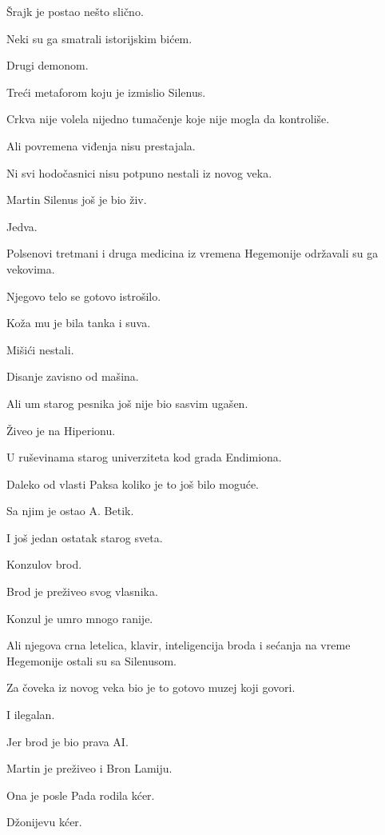 \bigskip

Šrajk je postao nešto slično.

Neki su ga smatrali istorijskim bićem.

Drugi demonom.

Treći metaforom koju je izmislio Silenus.

Crkva nije volela nijedno tumačenje koje nije mogla da kontroliše.

Ali povremena viđenja nisu prestajala.

\bigskip

Ni svi hodočasnici nisu potpuno nestali iz novog veka.

Martin Silenus još je bio živ.

Jedva.

\bigskip

Polsenovi tretmani i druga medicina iz vremena Hegemonije održavali su ga vekovima.

Njegovo telo se gotovo istrošilo.

Koža mu je bila tanka i suva.

Mišići nestali.

Disanje zavisno od mašina.

Ali um starog pesnika još nije bio sasvim ugašen.

\bigskip

Živeo je na Hiperionu.

U ruševinama starog univerziteta kod grada Endimiona.

Daleko od vlasti Paksa koliko je to još bilo moguće.

Sa njim je ostao A. Betik.

I još jedan ostatak starog sveta.

Konzulov brod.

\bigskip

Brod je preživeo svog vlasnika.

Konzul je umro mnogo ranije.

Ali njegova crna letelica, klavir, inteligencija broda i sećanja na vreme Hegemonije ostali su sa Silenusom.

Za čoveka iz novog veka bio je to gotovo muzej koji govori.

I ilegalan.

Jer brod je bio prava AI.

\bigskip

Martin je preživeo i Bron Lamiju.

Ona je posle Pada rodila kćer.

Džonijevu kćer.


